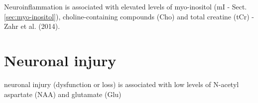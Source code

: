 Neuroinflammation is associated with elevated levels of myo-inositol (mI -
Sect.\ref{sec:myo-inositol}), choline-containing compounds (Cho) and total
creatine (tCr) - Zahr et al. (2014).



\section{Neuronal injury}

neuronal injury (dysfunction or loss) is associated with low levels of N-acetyl
aspartate (NAA) and glutamate (Glu)

